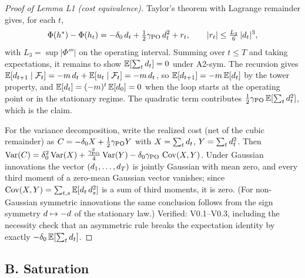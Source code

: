 \documentclass[11pt]{article}
\begin{document}
\begin{proof}[Proof of Lemma L1 (cost equivalence)]
Taylor's theorem with Lagrange remainder gives, for each $t$,
\[
\Phi(h^{*}) - \Phi(h_t)
 = -\delta_0\,d_t + \tfrac{1}{2}\gamma_{\mathrm{PO}}\,d_t^2 + r_t,
 \qquad |r_t| \le \tfrac{L_3}{6}\,|d_t|^3,
\]
with $L_3 = \sup |\Phi'''|$ on the operating interval. Summing over
$t \le T$ and taking expectations, it remains to show
$\mathbb{E}[\sum_t d_t] = 0$ under A2-sym. The recursion gives
$\mathbb{E}[d_{t+1} \mid \mathcal{F}_t] = -m\,d_t + \mathbb{E}[u_t \mid \mathcal{F}_t]
= -m\,d_t$, so $\mathbb{E}[d_{t+1}] = -m\,\mathbb{E}[d_t]$ by the tower property,
and $\mathbb{E}[d_t] = (-m)^t\,\mathbb{E}[d_0] = 0$ when the loop starts at the
operating point or in the stationary regime. The quadratic term contributes
$\tfrac{1}{2}\gamma_{\mathrm{PO}}\,\mathbb{E}[\sum_t d_t^2]$, which is the claim.

For the variance decomposition, write the realized cost (net of the cubic
remainder) as $C = -\delta_0 X + \tfrac{1}{2}\gamma_{\mathrm{PO}} Y$ with
$X = \sum_t d_t$, $Y = \sum_t d_t^2$. Then
$\operatorname{Var}(C) = \delta_0^2 \operatorname{Var}(X) + \tfrac{\gamma_{\mathrm{PO}}^2}{4}\operatorname{Var}(Y)
- \delta_0\gamma_{\mathrm{PO}}\,\operatorname{Cov}(X, Y)$. Under Gaussian innovations the vector
$(d_1,\dots,d_T)$ is jointly Gaussian with mean zero, and every third
moment of a zero-mean Gaussian vector vanishes; since
$\operatorname{Cov}(X,Y) = \sum_{t,s}\mathbb{E}[d_t\,d_s^2]$ is a sum of third moments, it is
zero. (For non-Gaussian symmetric innovations the same conclusion follows
from the sign symmetry $d \mapsto -d$ of the stationary law.)
Verified: V0.1--V0.3, including the necessity check that an asymmetric rule
breaks the expectation identity by exactly $-\delta_0\,\mathbb{E}[\sum_t d_t]$.
\end{proof}

\subsection*{B. Saturation}
\end{document}
